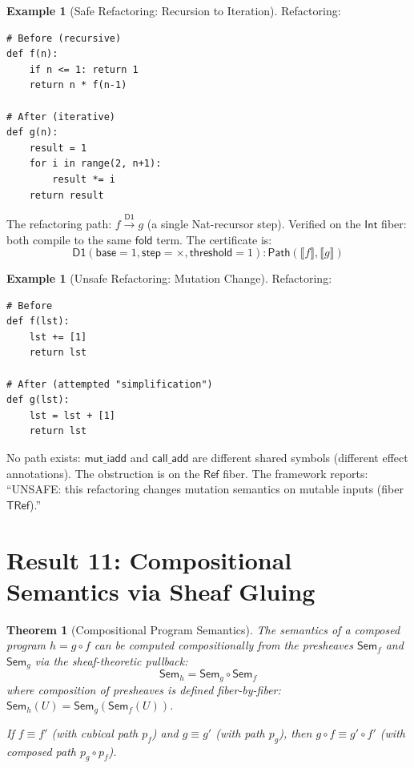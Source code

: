 \documentclass[11pt,a4paper]{report}
\theoremstyle{definition}
\newtheorem{example}[definition]{Example}
\theoremstyle{plain}
\newtheorem{theorem}[definition]{Theorem}
\newcommand{\den}[1]{\llbracket #1 \rrbracket}
\newcommand{\Path}{\mathsf{Path}}
\newcommand{\fold}{\mathsf{fold}}
\newcommand{\Sem}{\mathsf{Sem}}
\begin{document}
\begin{example}[Safe Refactoring: Recursion to Iteration]
Refactoring:
\begin{lstlisting}
# Before (recursive)
def f(n):
    if n <= 1: return 1
    return n * f(n-1)

# After (iterative)
def g(n):
    result = 1
    for i in range(2, n+1):
        result *= i
    return result
\end{lstlisting}

The refactoring path: $f \xrightarrow{\mathsf{D1}} g$ (a single
Nat-recursor step).  Verified on the $\mathsf{Int}$ fiber: both
compile to the same $\fold$ term.  The certificate is:
\[
  \mathsf{D1}(\mathsf{base}=1, \mathsf{step}=\times, \mathsf{threshold}=1)
  : \Path(\den{f}, \den{g})
\]
\end{example}

\begin{example}[Unsafe Refactoring: Mutation Change]
Refactoring:
\begin{lstlisting}
# Before
def f(lst):
    lst += [1]
    return lst

# After (attempted "simplification")
def g(lst):
    lst = lst + [1]
    return lst
\end{lstlisting}

No path exists: $\mathsf{mut\_iadd}$ and $\mathsf{call\_add}$ are
different shared symbols (different effect annotations).  The
obstruction is on the $\mathsf{Ref}$ fiber.  The framework reports:
``UNSAFE: this refactoring changes mutation semantics on mutable
inputs (fiber $\mathsf{TRef}$).''
\end{example}

\section{Result 11: Compositional Semantics via Sheaf Gluing}

\begin{theorem}[Compositional Program Semantics]
\label{thm:compositional}
The semantics of a composed program $h = g \circ f$ can be computed
\emph{compositionally} from the presheaves $\Sem_f$ and $\Sem_g$
via the sheaf-theoretic pullback:
\[
  \Sem_h = \Sem_g \circ \Sem_f
\]
where composition of presheaves is defined fiber-by-fiber:
$\Sem_h(U) = \Sem_g(\Sem_f(U))$.

If $f \equiv f'$ (with cubical path $p_f$) and $g \equiv g'$
(with path $p_g$), then $g \circ f \equiv g' \circ f'$ (with
composed path $p_g \circ p_f$).
\end{theorem}
\end{document}
